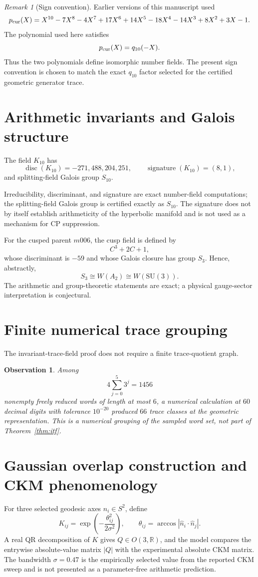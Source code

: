 \documentclass[11pt]{article}
\newtheorem{observation}[theorem]{Observation}\theoremstyle{remark}\newtheorem{remark}[theorem]{Remark}
\begin{document}
\begin{remark}[Sign convention]
Earlier versions of this manuscript used
\[
p_{\rm cur}(X)
=
X^{10}-7X^8-4X^7+17X^6+14X^5-18X^4-14X^3+8X^2+3X-1.
\]
The polynomial used here satisfies
\[
p_{\rm cur}(X)=q_{10}(-X).
\]
Thus the two polynomials define isomorphic number fields.  The present
sign convention is chosen to match the exact $q_{10}$ factor selected
for the certified geometric generator trace.
\end{remark}

\section{Arithmetic invariants and Galois structure}
\begin{proposition}
The field $K_{10}$ has
\[
\operatorname{disc}(K_{10})=-271{,}488{,}204{,}251,\qquad
\operatorname{signature}(K_{10})=(8,1),
\]
and splitting-field Galois group $S_{10}$.
\end{proposition}
Irreducibility, discriminant, and signature are exact number-field
computations; the splitting-field Galois group is certified exactly as
$S_{10}$.  The signature does not by itself establish arithmeticity of the
hyperbolic manifold and is not used as a mechanism for CP suppression.

For the cusped parent $m006$, the cusp field is defined by
\[
C^3+2C+1,
\]
whose discriminant is $-59$ and whose Galois closure has group $S_3$.
Hence, abstractly,
\[
S_3\cong W(A_2)\cong W(\mathrm{SU}(3)).
\]
The arithmetic and group-theoretic statements are exact; a physical
gauge-sector interpretation is conjectural.

\section{Finite numerical trace grouping}
The invariant-trace-field proof does not require a finite trace-quotient
graph.
\begin{observation}
Among
\[
4\sum_{j=0}^{5}3^j=1456
\]
nonempty freely reduced words of length at most $6$, a numerical
calculation at $60$ decimal digits with tolerance $10^{-20}$ produced
$66$ trace classes at the geometric representation. This is a numerical
grouping of the sampled word set, not part of Theorem~\ref{thm:itf}.
\end{observation}

\section{Gaussian overlap construction and CKM phenomenology}
For three selected geodesic axes $\hat n_i\in S^2$, define
\[
K_{ij}=\exp\!\left(-\frac{\theta_{ij}^2}{2\sigma^2}\right),\qquad
\theta_{ij}=\arccos|\hat n_i\cdot\hat n_j|.
\]
A real QR decomposition of $K$ gives $Q\in O(3,\mathbb R)$, and the
model compares the entrywise absolute-value matrix $|Q|$ with the
experimental absolute CKM matrix. The bandwidth $\sigma=0.47$ is the empirically selected
value from the reported CKM sweep and is not presented as a parameter-free
arithmetic prediction.
\end{document}
